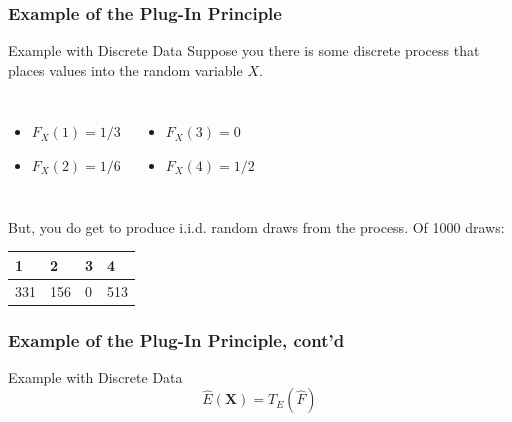 \documentclass[12pt, block=fill]{beamer}
\newcommand{\bs}{\boldsymbol}
\begin{document}
\begin{frame}[t]
  \frametitle{Example of the Plug-In Principle}
  \begin{block}{Example with Discrete Data}
    Suppose you there is some discrete process that places values into the
    random variable $X$.
    \begin{columns}
      \begin{itemize}
      \item $F_{X}(1) = 1/3$
      \item $F_{X}(2) = 1/6$
      \end{itemize}
      \begin{itemize}
      \item $F_{X}(3) = 0$
      \item $F_{X}(4) = 1/2$
      \end{itemize}
    \end{columns}
    But, you do get to produce i.i.d. random draws from the
    process. Of 1000 draws: \\
    \begin{center}
    \begin{tabular}{llll}
      \textbf{1} & \textbf{2} & \textbf{3} & \textbf{4} \\
      \hline
      331 & 156 & 0 & 513 \\
    \end{tabular}
    \end{center} 
  \end{block}
\end{frame}

\begin{frame}[t]
  \frametitle{Example of the Plug-In Principle, cont'd}
  \begin{block}{Example with Discrete Data}
    $$
    \hat{E}(\bs X) = T_{E}(\hat{F})
    $$
  \end{block}
\end{frame}
\end{document}
